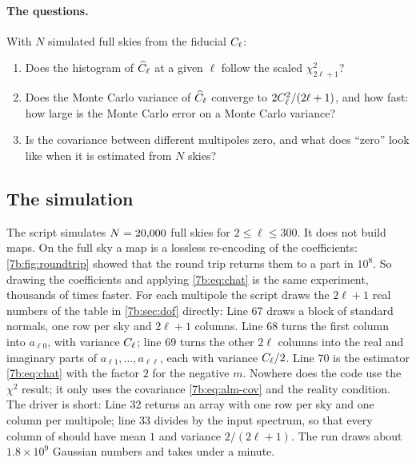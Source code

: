 \paragraph{The questions.} With $N$ simulated full skies from the fiducial $C_\ell$:
\begin{enumerate}[itemsep=1pt]
  \item Does the histogram of $\widehat{C}_\ell$ at a given $\ell$ follow the scaled $\chi^2_{2\ell+1}$?
  \item Does the Monte Carlo variance of $\widehat{C}_\ell$ converge to $2C_\ell^2/(2\ell+1)$, and how fast:
        how large is the Monte Carlo error on a Monte Carlo variance?
  \item Is the covariance between different multipoles zero, and what does ``zero'' look like
        when it is estimated from $N$ skies?
\end{enumerate}

\subsection{The simulation}
\label{7b:sec:mc-sim}

The script  simulates $N=20{,}000$ full skies for
$2\le\ell\le300$. It does not build maps. On the full sky a map is a lossless re-encoding of
the coefficients: \cref{7b:fig:roundtrip} showed that the round trip returns them to a part in
$10^8$. So drawing the coefficients and applying \eqref{7b:eq:chat} is the same experiment,
thousands of times faster. For each multipole the script draws the $2\ell+1$ real numbers of the
table in \cref{7b:sec:dof} directly:
\noindent Line 67 draws a block of standard normals, one row per sky and $2\ell+1$ columns.
Line 68 turns the first column into $a_{\ell0}$, with variance $C_\ell$; line 69 turns the other
$2\ell$ columns into the real and imaginary parts of $a_{\ell1},\dots,a_{\ell\ell}$, each with
variance $C_\ell/2$. Line 70 is the estimator \eqref{7b:eq:chat} with the factor $2$ for the
negative $m$. Nowhere does the code use the $\chi^2$ result; it only uses the covariance
\eqref{7b:eq:alm-cov} and the reality condition. The driver is short:
\noindent Line 32 returns an array with one row per sky and one column per multipole; line 33
divides by the input spectrum, so that every column of  should have mean $1$ and
variance $2/(2\ell+1)$. The run draws about $1.8\times10^9$ Gaussian numbers and takes
under a minute.

